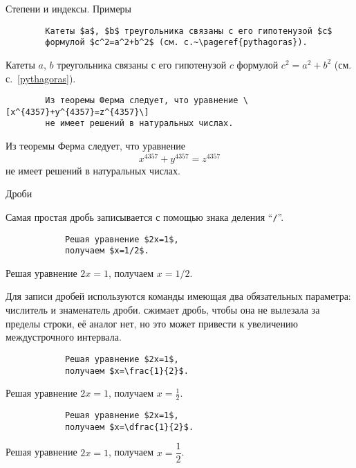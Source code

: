 \begin{frame}[fragile]{Степени и индексы. Примеры}
	
	\begin{verbatim}
		Катеты $a$, $b$ треугольника связаны с его гипотенузой $c$
		формулой $c^2=a^2+b^2$ (см. с.~\pageref{pythagoras}).
	\end{verbatim}
	
	Катеты $a$, $b$ треугольника связаны с его гипотенузой $c$
	формулой $c^2=a^2+b^2$ (см. с.~\ref{pythagoras}).
	
	\begin{verbatim}
		Из теоремы Ферма следует, что уравнение \[x^{4357}+y^{4357}=z^{4357}\]
		не имеет решений в натуральных числах.
	\end{verbatim}
	
	Из теоремы Ферма следует, что уравнение
	\[
	x^{4357}+y^{4357}=z^{4357}
	\]
	не имеет решений в натуральных числах.
\end{frame}

\begin{frame}[fragile]{Дроби}
	
	Самая простая дробь записывается с помощью знака деления ``\texttt{/}''.
	
	\begin{minipage}{0.39\textwidth}
		\begin{verbatim}
			Решая уравнение $2x=1$, 
			получаем $x=1/2$. 
		\end{verbatim}
	\end{minipage}
	\begin{minipage}{0.59\textwidth}
		Решая уравнение $2x=1$, получаем $x=1/2$. 
	\end{minipage}
	
	Для записи дробей используются команды \texttt{\frac} имеющая два обязательных параметра: числитель и знаменатель дроби. \texttt{\frac} сжимает дробь, чтобы она не вылезала за пределы строки, её аналог \texttt{\dfrac} нет, но это может привести к увеличению междустрочного интервала.
	
	\begin{minipage}{0.39\textwidth}
		\begin{verbatim}
			Решая уравнение $2x=1$, 
			получаем $x=\frac{1}{2}$. 
		\end{verbatim}
	\end{minipage}
	\begin{minipage}{0.59\textwidth}
		Решая уравнение $2x=1$, получаем $x=\frac{1}{2}$. 
	\end{minipage}

	\begin{minipage}{0.39\textwidth}
		\begin{verbatim}
			Решая уравнение $2x=1$, 
			получаем $x=\dfrac{1}{2}$. 
		\end{verbatim}
	\end{minipage}
	\begin{minipage}{0.59\textwidth}
		Решая уравнение $2x=1$, получаем $x=\dfrac{1}{2}$. 
	\end{minipage}
\end{frame}


